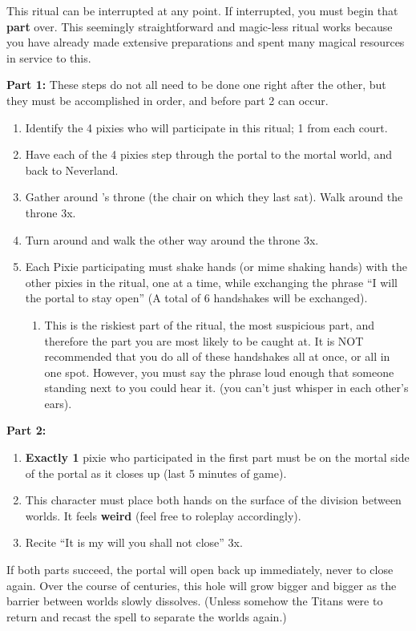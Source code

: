 \documentclass[green]{PP}
\begin{document}
\name{\gPortal{}}

This ritual can be interrupted at any point. If interrupted, you must begin that \textbf{part} over. This seemingly straightforward and magic-less ritual works because you have already made extensive preparations and spent many magical resources in service to this.

\textbf{Part 1:}
These steps do not all need to be done one right after the other, but they must be accomplished in order, and before part 2 can occur.
\begin{enumerate}
	\item Identify the 4 pixies who will participate in this ritual; 1 from each court.
	\item Have each of the 4 pixies step through the portal to the mortal world, and back to Neverland.
	\item Gather around \cSHead{}’s throne (the chair on which they last sat). Walk around the throne 3x.
	\item Turn around and walk the other way around the throne 3x.
	\item Each Pixie participating must shake hands (or mime shaking hands) with the other pixies in the ritual, one at a time, while exchanging the phrase “I will the portal to stay open” (A total of 6 handshakes will be exchanged).
	\begin{enumerate}
		\item This is the riskiest part of the ritual, the most suspicious part, and therefore the part you are most likely to be caught at. It is NOT recommended that you do all of these handshakes all at once, or all in one spot. However, you must say the phrase loud enough that someone standing next to you could hear it. (you can’t just whisper in each other’s ears).
	\end{enumerate}
\end{enumerate}

\textbf{Part 2:}
\begin{enumerate}
	\item \textbf{Exactly 1} pixie who participated in the first part must be on the mortal side of the portal as it closes up (last 5 minutes of game).
	\item This character must place both hands on the surface of the division between worlds. It feels \textbf{weird} (feel free to roleplay accordingly).
	\item Recite “It is my will you shall not close” 3x.
\end{enumerate}

If both parts succeed, the portal will open back up immediately, never to close again. Over the course of centuries, this hole will grow bigger and bigger as the barrier between worlds slowly dissolves. (Unless somehow the Titans were to return and recast the spell to separate the worlds again.)
\end{document}
